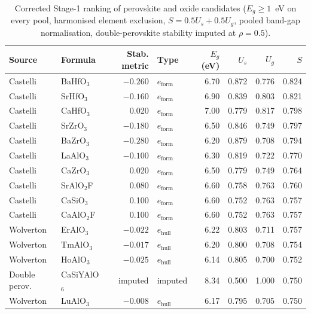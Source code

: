 \begin{table}[htbp]
\centering
\footnotesize
\setlength{\tabcolsep}{4pt}
\caption{Corrected Stage-1 ranking of perovskite and oxide candidates ($E_g\ge1$~eV on every pool, harmonised element exclusion, $S=0.5U_s+0.5U_g$, pooled band-gap normalisation, double-perovskite stability imputed at $\rho=0.5$).}
\label{tab:a1_corrected_top}
\begin{tabular}{llrlrrrr}
\toprule
Source & Formula & Stab. metric & Type & $E_g$ (eV) & $U_s$ & $U_g$ & $S$ \\
\midrule
Castelli & BaHfO$_{3}$ & $-0.260$ & $e_{\mathrm{form}}$ & 6.70 & 0.872 & 0.776 & 0.824 \\
Castelli & SrHfO$_{3}$ & $-0.160$ & $e_{\mathrm{form}}$ & 6.90 & 0.839 & 0.803 & 0.821 \\
Castelli & CaHfO$_{3}$ & 0.020 & $e_{\mathrm{form}}$ & 7.00 & 0.779 & 0.817 & 0.798 \\
Castelli & SrZrO$_{3}$ & $-0.180$ & $e_{\mathrm{form}}$ & 6.50 & 0.846 & 0.749 & 0.797 \\
Castelli & BaZrO$_{3}$ & $-0.280$ & $e_{\mathrm{form}}$ & 6.20 & 0.879 & 0.708 & 0.794 \\
Castelli & LaAlO$_{3}$ & $-0.100$ & $e_{\mathrm{form}}$ & 6.30 & 0.819 & 0.722 & 0.770 \\
Castelli & CaZrO$_{3}$ & 0.020 & $e_{\mathrm{form}}$ & 6.50 & 0.779 & 0.749 & 0.764 \\
Castelli & SrAlO$_{2}$F & 0.080 & $e_{\mathrm{form}}$ & 6.60 & 0.758 & 0.763 & 0.760 \\
Castelli & CaSiO$_{3}$ & 0.100 & $e_{\mathrm{form}}$ & 6.60 & 0.752 & 0.763 & 0.757 \\
Castelli & CaAlO$_{2}$F & 0.100 & $e_{\mathrm{form}}$ & 6.60 & 0.752 & 0.763 & 0.757 \\
Wolverton & ErAlO$_{3}$ & $-0.022$ & $e_{\mathrm{hull}}$ & 6.22 & 0.803 & 0.711 & 0.757 \\
Wolverton & TmAlO$_{3}$ & $-0.017$ & $e_{\mathrm{hull}}$ & 6.20 & 0.800 & 0.708 & 0.754 \\
Wolverton & HoAlO$_{3}$ & $-0.025$ & $e_{\mathrm{hull}}$ & 6.14 & 0.805 & 0.700 & 0.752 \\
Double perov. & CaSiYAlO$_{6}$ & imputed & imputed & 8.34 & 0.500 & 1.000 & 0.750 \\
Wolverton & LuAlO$_{3}$ & $-0.008$ & $e_{\mathrm{hull}}$ & 6.17 & 0.795 & 0.705 & 0.750 \\
\bottomrule
\end{tabular}
\end{table}

